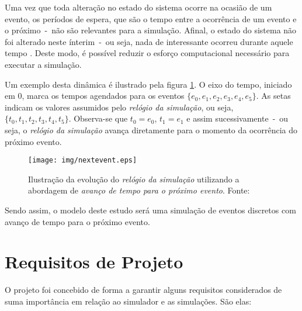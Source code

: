 Uma vez que toda alteração no estado do sistema ocorre na ocasião de um evento,
os períodos de espera, que são o tempo entre a ocorrência de um evento e o
próximo~-~não são relevantes para a simulação. Afinal, o estado do sistema não
foi alterado neste ínterim~-~ou seja, nada de interessante ocorreu durante
aquele tempo \cite{Sim}. Deste modo, é possível reduzir o esforço computacional
necessário para executar a simulação.

Um exemplo desta dinâmica é ilustrado pela figura \ref{fig:nextevent}. O eixo do
tempo, iniciado em 0, marca os tempos agendados para os eventos $\{e_{0}, e_{1},
e_{2}, e_{3}, e_{4}, e_{5}\}$. As setas indicam os valores assumidos pelo
\textit{relógio da simulação}, ou seja, $\{t_{0}, t_{1}, t_{2}, t_{3}, t_{4},
t_{5}\}$. Observa-se que $t_{0} = e_{0}$, $t_{1} = e_{1}$ e assim
sucessivamente~-~ou seja, o \textit{relógio da simulação} avança diretamente
para o momento da ocorrência do próximo evento.

\begin{figure}[htb!]
\centering\texttt{[image: img/nextevent.eps]}
\caption[Avanço de tempo para o próximo evento]{\label{fig:nextevent}Ilustração da evolução do \textit{relógio da simulação} utilizando a abordagem de \textit{avanço de tempo para o próximo evento}. Fonte:~\cite{Law}}
\end{figure}

Sendo assim, o modelo deste estudo será uma simulação de eventos discretos com avanço de tempo para o próximo evento.

\section{\label{simulator:requirements}Requisitos de Projeto}

O projeto foi concebido de forma a garantir alguns requisitos considerados de
suma importância em relação ao simulador e as simulações. São elas:

